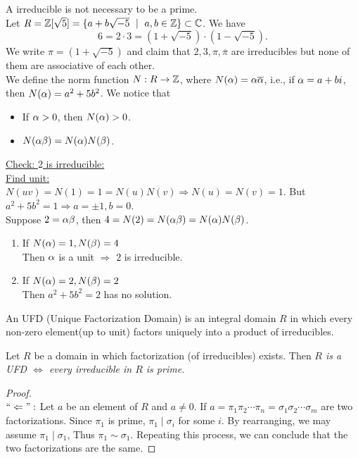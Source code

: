 \begin{remark}
A irreducible is not necessary to be a prime.\\
Let $R = \Z[\sqrt{5}] = \{a+b\sqrt{-5}\ \mid \ a,b\in\Z\}\subset \C$. We have $$6=2\cdot3 = (1+\sqrt{-5})\cdot(1-\sqrt{-5}).$$We write $\pi = (1+\sqrt{-5})$ and claim that $2,3,\pi,\overline{\pi}$ are irreducibles but none of them are associative of each other.\\
We define the norm function $N:R\rightarrow \mathbb{Z}$, where $N(\alpha)=\alpha\overline{\alpha}$, i.e., if $\alpha = a+bi$, then $N(\alpha)=a^2+5b^2$. We notice that 
\begin{itemize}
\item If $\alpha>0$, then $N(\alpha)>0$.
\item $N(\alpha\beta)=N(\alpha)N(\beta)$.
\end{itemize}
\underline{Check: $2$ is irreducible:}\\
\underline{Find unit:} \\$N(uv) = N(1) = 1 = N(u)N(v) \Rightarrow N(u)=N(v) = 1$. But $a^2+5b^2 = 1\Rightarrow a=\pm1, b=0$.\\Suppose $2=\alpha\beta$, then $4=N(2) = N(\alpha\beta) = N(\alpha)N(\beta)$.
\begin{enumerate}
\item If $N(\alpha) = 1, N(\beta) = 4$\\
Then $\alpha$ is a unit $\Rightarrow$ $2$ is irreducible.
\item If $N(\alpha) = 2, N(\beta) = 2$\\
Then $a^2+5b^2 = 2$ has no solution.
\end{enumerate}
\end{remark}
\begin{definition}
An UFD (Unique Factorization Domain) is an integral domain $R$ in which every non-zero element(up to unit) factors uniquely into a product of irreducibles.
\end{definition}
\begin{proposition}
Let $R$ be a domain in which factorization (of irreducibles) exists. Then \emph{$R$ is a UFD $\Leftrightarrow$ every irreducible in $R$ is prime.}
\end{proposition}
\begin{proof}\mbox{}\\
$``\Leftarrow":$ Let $a$ be an element of $R$ and $a\ne0$. If $a=\pi_1\pi_2\cdots\pi_n=\sigma_1\sigma_2\cdots\sigma_m$ are two factorizations. Since $\pi_1$ is prime, $\pi_1\mid \sigma_i$ for some $i$. By rearranging, we may assume $\pi_1\mid \sigma_1$, Thus $\pi_1\sim \sigma_1$. Repeating this process, we can conclude that the two factorizations are the same.
\notcomplete
\end{proof}
